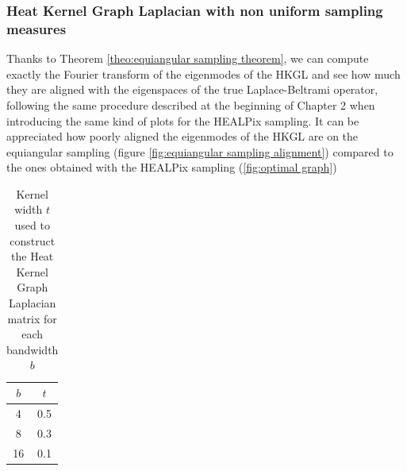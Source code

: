 \subsubsection{Heat Kernel Graph Laplacian with non uniform sampling measures}
Thanks to Theorem \ref{theo:equiangular sampling theorem}, we can compute exactly the Fourier transform of the eigenmodes of the HKGL and see how much they are aligned with the eigenspaces of the true Laplace-Beltrami operator, following the same procedure described at the beginning of Chapter 2 when introducing the same kind of plots for the HEALPix sampling. It can be appreciated how poorly aligned the eigenmodes of the HKGL are on the equiangular sampling (figure \ref{fig:equiangular sampling alignment}) compared to the ones obtained with the HEALPix sampling (\ref{fig:optimal graph})


\begin{table}[h!]
	\centering
	\begin{tabular}{ c|c } 
$b$ & $t$ \\ 
	\hline
4 & 0.5 \\ 
8 & 0.3 \\ 
16 & 0.1 \\ 
	\end{tabular}
	\caption{\label{table:equiangular kernel width}Kernel width $t$ used to construct the Heat Kernel Graph Laplacian matrix for each bandwidth $b$}
\end{table}

